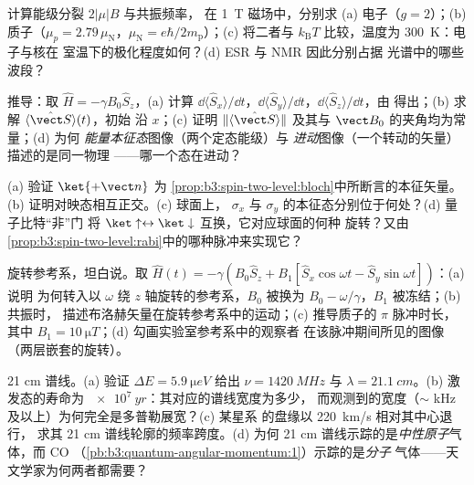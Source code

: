 \begin{exercise}[$\star$]\label{exo:b3:spin-two-level:4}
计算能级分裂 $2|\mu|B$ 与共振频率，
在 \qty{1}{T} 磁场中，分别求 (a) 电子（$g = 2$）；(b)
质子（$\mu_p = 2.79\,\mu_{\text{N}}$，$\mu_{\text{N}} =
e\hbar/2m_{\text{p}}$）；(c) 将二者与 $k_{\text{B}}T$ 比较，温度为
\qty{300}{K}：电子与核在
室温下的极化程度如何？(d) ESR 与 NMR 因此分别占据
光谱中的哪些波段？
\end{exercise}

\begin{exercise}[$\star\star$]\label{exo:b3:spin-two-level:5}
推导：取 $\hat H = -\gamma B_0\hat S_z$，(a)
计算 $\dd\langle\hat S_x\rangle/\dd t$，$\dd\langle\hat
S_y\rangle/\dd t$，$\dd\langle\hat S_z\rangle/\dd t$，由
得出；(b) 求解 $\langle\hat{\vect S}\rangle(t)$，初始
沿 $x$；(c) 证明 $\|\langle\hat{\vect S}\rangle\|$
及其与 $\vect B_0$ 的夹角均为常量；(d) 为何
\emph{能量本征态}图像（两个定态能级）与
\emph{进动}图像（一个转动的矢量）描述的是同一物理
——哪一个态在进动？
\end{exercise}

\begin{exercise}[$\star\star$]\label{exo:b3:spin-two-level:6}
(a) 验证 $\ket{+\vect n}$ 为
\cref{prop:b3:spin-two-level:bloch}中所断言的本征矢量。(b)
证明对映态相互正交。(c) 球面上，
$\sigma_x$ 与 $\sigma_y$ 的本征态分别位于何处？(d) 量子比特“非”门
将 $\ket\uparrow \leftrightarrow \ket\downarrow$ 互换，它对应球面的何种
旋转？又由
\cref{prop:b3:spin-two-level:rabi}中的哪种脉冲来实现它？
\end{exercise}

\begin{exercise}[$\star\star$]\label{exo:b3:spin-two-level:7}
旋转参考系，坦白说。取 $\hat H(t) = -\gamma(B_0\hat S_z
+ B_1[\hat S_x\cos\omega t - \hat S_y\sin\omega t])$：(a) 说明
为何转入以 $\omega$ 绕 $z$ 轴旋转的参考系，$B_0$ 被换为
$B_0 - \omega/\gamma$，$B_1$ 被冻结；(b) 共振时，
描述布洛赫矢量在旋转参考系中的运动；(c)
推导质子的 $\pi$ 脉冲时长，其中 $B_1 =
\qty{10}{\micro T}$；(d) 勾画实验室参考系中的观察者
在该脉冲期间所见的图像（两层嵌套的旋转）。
\end{exercise}

\begin{exercise}[$\star\star$]\label{exo:b3:spin-two-level:8}
21 cm 谱线。(a) 验证 $\Delta E = \qty{5.9}{\micro eV}$
给出 $\nu = \qty{1420}{MHz}$ 与 $\lambda = \qty{21.1}{cm}$。(b)
激发态的寿命为 $\qty{e7}{yr}$：其对应的谱线宽度为多少，
而观测到的宽度（$\sim$ kHz 及以上）为何完全是多普勒展宽？(c) 某星系
的盘缘以 \qty{220}{km/s} 相对其中心退行，
求其 21 cm 谱线轮廓的频率跨度。(d) 为何
21 cm 谱线示踪的是\emph{中性原子}气体，而 CO
（\cref{pb:b3:quantum-angular-momentum:1}）示踪的是\emph{分子}
气体——天文学家为何两者都需要？
\end{exercise}

